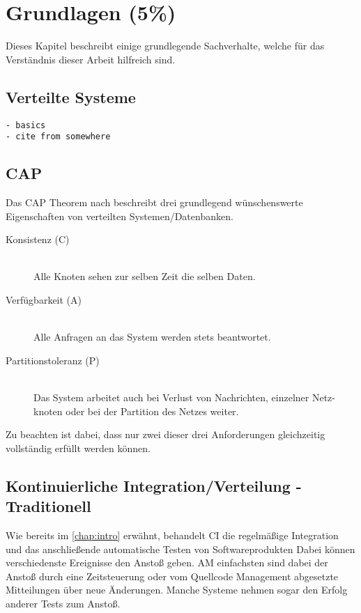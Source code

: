 \chapter{Grundlagen (5\%)}
\label{chap:base}
Dieses Kapitel beschreibt einige grundlegende Sachverhalte,
welche für das Verständnis dieser Arbeit hilfreich sind.

\section{Verteilte Systeme}
\label{sec:base:vs}

\begin{verbatim}
- basics
- cite from somewhere
\end{verbatim}

\section{CAP}
\label{sec:base:cap}
Das \ac{CAP} Theorem nach \cite{brewer:cap} beschreibt drei grundlegend
wünschenswerte Eigenschaften von verteilten Systemen/Datenbanken.

\begin{description}
  \item[Konsistenz (C)] \hfill \\
      Alle Knoten sehen zur selben Zeit die selben Daten. 
  \item[Verfügbarkeit (A)] \hfill \\
      Alle Anfragen an das System werden stets beantwortet.
  \item[Partitionstoleranz (P)] \hfill \\
      Das System arbeitet auch bei Verlust von Nachrichten,
      einzelner Netz-knoten oder bei der Partition des Netzes weiter.
\end{description}

Zu beachten ist dabei, dass nur zwei dieser drei Anforderungen gleichzeitig
vollständig erfüllt werden können.

\section{Kontinuierliche Integration/Verteilung - Traditionell}
\label{sec:base:ci}

Wie bereits im \cref{chap:intro} erwähnt, behandelt CI die regelmäßige Integration und das anschließende automatische Testen von Softwareprodukten
Dabei können verschiedenste Ereignisse den Anstoß geben.
AM einfachsten sind dabei der Anstoß durch eine Zeitsteuerung
oder vom Quellcode Management abgesetzte Mitteilungen über neue Änderungen.
Manche Systeme nehmen sogar den Erfolg anderer Tests zum Anstoß.

